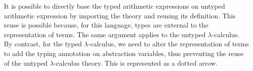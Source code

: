 It is possible to directly base the typed arithmetic expressions on untyped arithmetic expression
by importing the theory and reusing its definition. This reuse is possible because, for this
language, types are external to the representation of terms. The same argument applies to the
untyped $\lambda$-calculus. By contrast, for the typed $\lambda$-calculus, we need to alter the
representation of terms to add the typing annotation on abstraction variables, thus preventing the
reuse of the untyped $\lambda$-calculus theory. This is represented as a dotted arrow.
